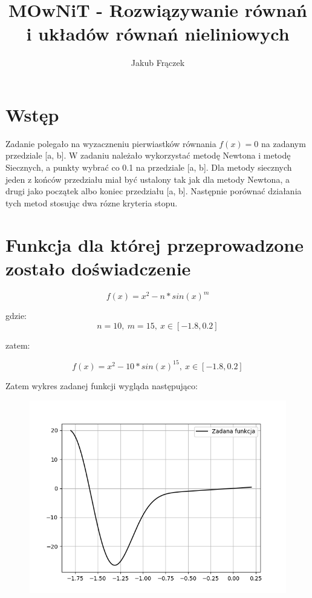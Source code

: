 \documentclass{article}
\title{MOwNiT - Rozwiązywanie równań i układów równań nieliniowych}
\author{Jakub Frączek}
\begin{document}
\maketitle

\section{Wstęp}

Zadanie polegało na wyzaczneniu pierwiastków równania \(f(x) = 0\) na zadanym przedziale [a, b]. W zadaniu należało wykorzystać metodę Newtona i metodę Siecznych, a punkty wybrać co 0.1 na przedziale [a, b]. Dla metody siecznych jeden z końców przedziału miał być ustalony tak jak dla metody Newtona, a drugi jako początek albo koniec przedziału [a, b]. Następnie porównać działania tych metod stosując dwa rózne kryteria stopu.

\section{Funkcja dla której przeprowadzone zostało doświadczenie}

\[f(x) = x^2 - n * sin(x)^m\]

\noindent
gdzie:
\[n = 10, \ m = 15, \ x \in [-1.8, 0.2]\]

\noindent
zatem:

\[f(x) = x^2 - 10 * sin(x)^{15}, \ x \in [-1.8, 0.2]\]

\bigbreak

\noindent
Zatem wykres zadanej funkcji wygląda następująco:

\begin{figure}[H]
  \centering
  \begin{minipage}[b]{0.5\textwidth}
    \includegraphics[width=\textwidth]{zadana_funkcja.png}
  \end{minipage}
\end{figure}
\end{document}
